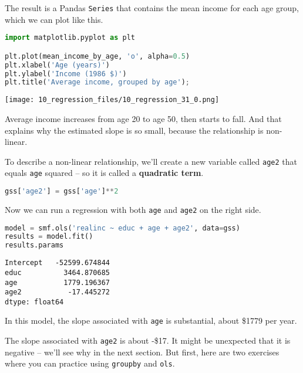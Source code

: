 The result is a Pandas \passthrough{\lstinline!Series!} that contains
the mean income for each age group, which we can plot like this.

\begin{lstlisting}[language=Python,style=source]
import matplotlib.pyplot as plt

plt.plot(mean_income_by_age, 'o', alpha=0.5)
plt.xlabel('Age (years)')
plt.ylabel('Income (1986 $)')
plt.title('Average income, grouped by age');
\end{lstlisting}

\begin{center}
\texttt{[image: 10\_regression\_files/10\_regression\_31\_0.png]}
\end{center}

Average income increases from age 20 to age 50, then starts to fall. And
that explains why the estimated slope is so small, because the
relationship is non-linear.

\pagebreak

To describe a non-linear relationship, we'll
create a new variable called \passthrough{\lstinline!age2!} that equals
\passthrough{\lstinline!age!} squared -- so it is called a
\textbf{quadratic term}.

\begin{lstlisting}[language=Python,style=source]
gss['age2'] = gss['age']**2
\end{lstlisting}

Now we can run a regression with both \passthrough{\lstinline!age!} and
\passthrough{\lstinline!age2!} on the right side.

\begin{lstlisting}[language=Python,style=source]
model = smf.ols('realinc ~ educ + age + age2', data=gss)
results = model.fit()
results.params
\end{lstlisting}

\begin{lstlisting}[style=output]
Intercept   -52599.674844
educ          3464.870685
age           1779.196367
age2           -17.445272
dtype: float64
\end{lstlisting}

In this model, the slope associated with \passthrough{\lstinline!age!}
is substantial, about \$1779 per year.

The slope associated with \passthrough{\lstinline!age2!} is about -\$17.
It might be unexpected that it is negative -- we'll see why in the next
section. But first, here are two exercises where you can practice using
\passthrough{\lstinline!groupby!} and \passthrough{\lstinline!ols!}.

